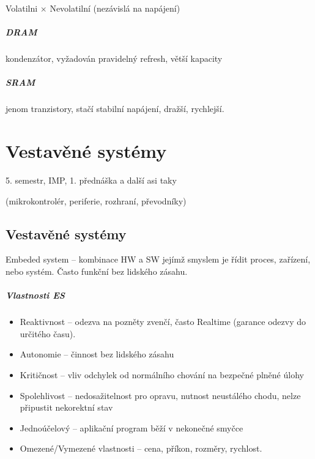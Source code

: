 \documentclass[a4paper, 11pt]{report}
\begin{document}
Volatilni $\times$ Nevolatilní (nezávislá na napájení)

\paragraph{DRAM} kondenzátor, vyžadován pravidelný refresh, větší kapacity
\paragraph{SRAM} jenom tranzistory, stačí stabilní napájení, dražší, rychlejší.















\chapter{Vestavěné systémy} \label{cha:5}

5. semestr, IMP, 1. přednáška a další asi taky

(mikrokontrolér, periferie, rozhraní, převodníky)

\section{Vestavěné systémy}
Embeded system -- kombinace HW a SW jejímž smyslem je řídit proces, zařízení, nebo systém. Často funkční bez lidského zásahu.

\paragraph{Vlastnosti ES}
\begin{itemize}
	\item Reaktivnost -- odezva na pozněty zvenčí, často Realtime (garance odezvy do určitého času).
	\item Autonomie -- činnost bez lidského zásahu
	\item Kritičnost -- vliv odchylek od normálního chování na bezpečné plněné úlohy
	\item Spolehlivost -- nedosažitelnost pro opravu, nutnost neustálého chodu, nelze připustit nekorektní stav
	\item Jednoúčelový -- aplikační program běží v nekonečné smyčce
	\item Omezené/Vymezené vlastnosti -- cena, příkon, rozměry, rychlost.
\end{itemize}
\end{document}
